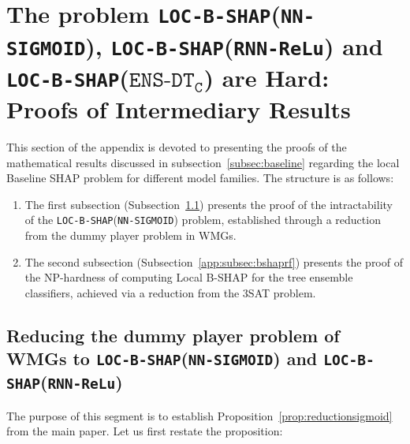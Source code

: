 \section{The problem \texttt{LOC-B-SHAP}(\texttt{NN-SIGMOID}), \texttt{LOC-B-SHAP}(\texttt{RNN-ReLu}) and \texttt{LOC-B-SHAP}($\texttt{ENS-DT}_{\texttt{C}}$) are Hard: Proofs of Intermediary Results} \label{app:BSHAPSIGMOID}

This section of the appendix is devoted to presenting the proofs of the mathematical results discussed in subsection~\ref{subsec:baseline} regarding the local Baseline SHAP problem for different model families. The structure is as follows:

\begin{enumerate}
    \item 
The first subsection (Subsection~\ref{app:subsec:locbshap}) presents the proof of the intractability of the \texttt{LOC-B-SHAP}(\texttt{NN-SIGMOID}) problem, established through a reduction from the dummy player problem in WMGs.
    \item The second subsection (Subsection~\ref{app:subsec:bshaprf}) presents the proof of the NP-hardness of computing Local B-SHAP for the tree ensemble classifiers, achieved via a reduction from the 3SAT problem.
\end{enumerate}

 
\subsection{Reducing the dummy player problem of WMGs to \texttt{LOC-B-SHAP}(\texttt{NN-SIGMOID}) and \texttt{LOC-B-SHAP}(\texttt{RNN-ReLu})} \label{app:subsec:locbshap}


The purpose of this segment is to establish Proposition~\ref{prop:reductionsigmoid} from the main paper. Let us first restate the proposition:

